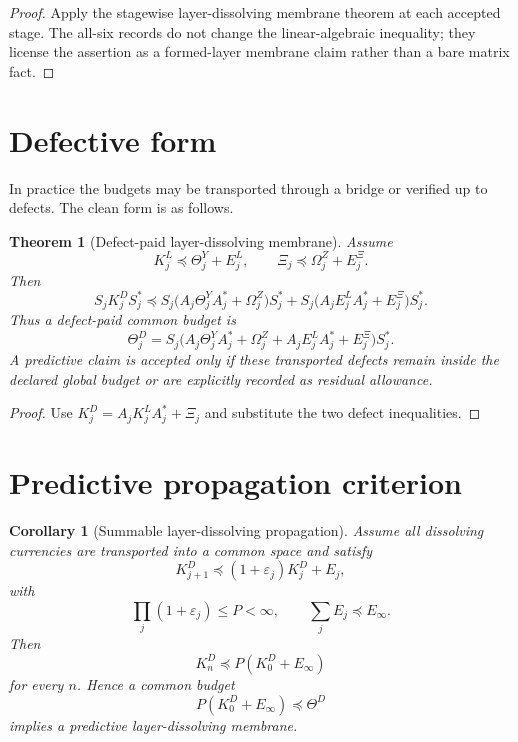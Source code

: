 \documentclass[11pt]{article}
\newtheorem{theorem}{Theorem}
\newtheorem{corollary}{Corollary}
\begin{document}
\begin{proof}
Apply the stagewise layer-dissolving membrane theorem at each accepted stage.  The all-six records do not change the linear-algebraic inequality; they license the assertion as a formed-layer membrane claim rather than a bare matrix fact.
\end{proof}

\section{Defective form}
In practice the budgets may be transported through a bridge or verified up to defects.  The clean form is as follows.

\begin{theorem}[Defect-paid layer-dissolving membrane]
Assume
\[
 K^L_j\preceq\Theta^Y_j+E^L_j,
\qquad
 \Xi_j\preceq\Omega^Z_j+E^\Xi_j.
\]
Then
\[
 S_jK^D_jS_j^*
 \preceq
 S_j\bigl(A_j\Theta^Y_jA_j^*+\Omega^Z_j\bigr)S_j^*
 +S_j\bigl(A_jE^L_jA_j^*+E^\Xi_j\bigr)S_j^*.
\]
Thus a defect-paid common budget is
\[
 \Theta^D_j=
 S_j\bigl(A_j\Theta^Y_jA_j^*+\Omega^Z_j+A_jE^L_jA_j^*+E^\Xi_j\bigr)S_j^*.
\]
A predictive claim is accepted only if these transported defects remain inside the declared global budget or are explicitly recorded as residual allowance.
\end{theorem}

\begin{proof}
Use
$K^D_j=A_jK^L_jA_j^*+\Xi_j$ and substitute the two defect inequalities.
\end{proof}

\section{Predictive propagation criterion}
\begin{corollary}[Summable layer-dissolving propagation]
Assume all dissolving currencies are transported into a common space and satisfy
\[
 K^D_{j+1}\preceq(1+\varepsilon_j)K^D_j+E_j,
\]
with
\[
 \prod_j(1+\varepsilon_j)\le P<\infty,
 \qquad
 \sum_jE_j\preceq E_\infty.
\]
Then
\[
 K^D_n\preceq P(K^D_0+E_\infty)
\]
for every $n$.  Hence a common budget
\[
 P(K^D_0+E_\infty)\preceq\Theta^D
\]
implies a predictive layer-dissolving membrane.
\end{corollary}
\end{document}
